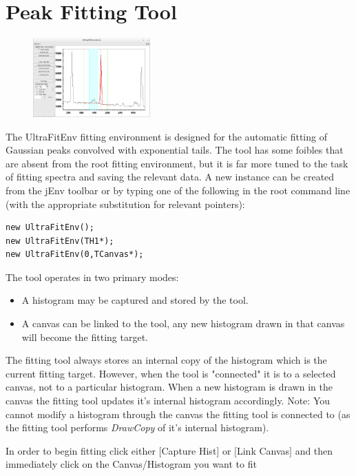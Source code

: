 \documentclass[a4paper,10pt]{article}
\begin{document}
\section{Peak Fitting Tool}\label{sec:peakfit}
\begin{figure}
\includegraphics[width=0.4\textwidth]{jFitB.png}
\end{figure}
The UltraFitEnv fitting environment is designed for the automatic fitting of Gaussian peaks convolved with exponential tails.
The tool has some foibles that are absent from the root fitting environment, but it is far more tuned to the task of fitting spectra and saving the relevant data.
A new instance can be created from the jEnv toolbar or by typing one of the following in the root command line (with the appropriate substitution for relevant pointers):
\lstset{language=C++}
\begin{lstlisting}
new UltraFitEnv();
new UltraFitEnv(TH1*);
new UltraFitEnv(0,TCanvas*);
\end{lstlisting}
The tool operates in two primary modes:
\begin{itemize}
\item A histogram may be captured and stored by the tool.
\item A canvas can be linked to the tool, any new histogram drawn in that canvas will become the fitting target.
\end{itemize}

The fitting tool always stores an internal copy of the histogram which is the current fitting target. However, when the tool is "connected" it is to a selected canvas, not to a particular histogram. When a new histogram is drawn in the canvas the fitting tool updates it's internal histogram accordingly. Note: You cannot modify a histogram through the canvas the fitting tool is connected to (as the fitting tool performs \textit{DrawCopy} of it's internal histogram).

In order to begin fitting click either $[$Capture Hist$]$ or $[$Link Canvas$]$ and then immediately click on the Canvas/Histogram you want to fit
\end{document}

